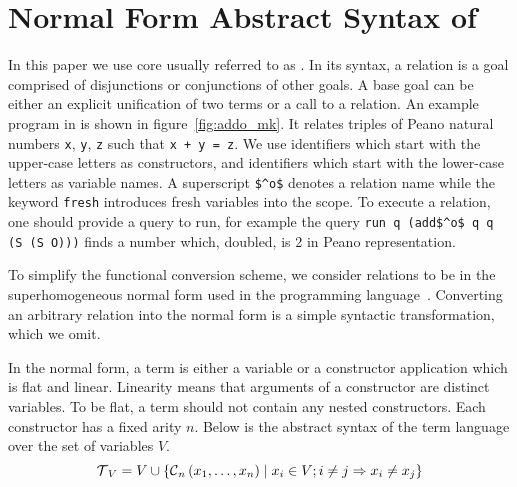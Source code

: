 \section{Normal Form Abstract Syntax of \mk}

In this paper we use core \mk usually referred to as \micro.
In its syntax, a relation is a goal comprised of disjunctions or conjunctions of other goals.
A base goal can be either an explicit unification of two terms or a call to a relation.
An example program in \mk is shown in figure~\ref{fig:addo_mk}.
It relates triples of Peano natural numbers \lstinline{x}, \lstinline{y}, \lstinline{z} such that \lstinline{x + y = z}.
We use identifiers which start with the upper-case letters as constructors, and identifiers which start with the lower-case letters as variable names.
A superscript \lstinline{$^o$} denotes a relation name while the keyword \lstinline{fresh} introduces fresh variables into the scope.
To execute a relation, one should provide a query to run, for example the query \lstinline{run q (add$^o$ q q (S (S O)))} finds a number which, doubled, is 2 in Peano representation.





To simplify the functional conversion scheme, we consider \mk relations to be in the superhomogeneous normal form used in the \merc programming language~\cite{somogyi1996execution}.
Converting an arbitrary \mk relation into the normal form is a simple syntactic transformation, which we omit.

In the normal form, a term is either a variable or a constructor application which is flat and linear.
Linearity means that arguments of a constructor are distinct variables.
To be flat, a term should not contain any nested constructors.
Each constructor has a fixed arity $n$.
Below is the abstract syntax of the term language over the set of variables $V$.
\[  \operatorname{\mathcal{T}}_{V} = V \cup \{\operatorname{\mathcal{C}}_{n}\left( x_1, \ldots, x_{n} \right) \mid x_{i}\in V; i \neq j \Rightarrow x_i \neq x_j\} \]


